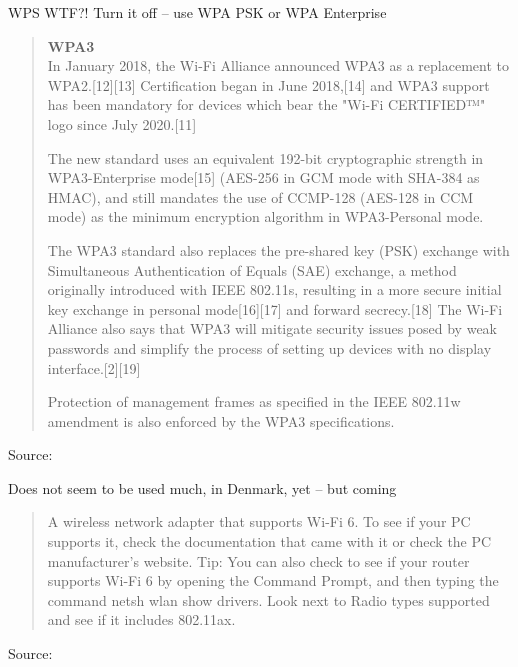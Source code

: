 \documentclass[Screen16to9,17pt]{foils}
\begin{document}
\vskip 1cm
\centerline{WPS WTF?! Turn it off -- use WPA PSK or WPA Enterprise}




\begin{quote}\small
{\bf WPA3}\\
In January 2018, the Wi-Fi Alliance announced WPA3 as a replacement to WPA2.[12][13] Certification began in June 2018,[14] and WPA3 support has been mandatory for devices which bear the "Wi-Fi CERTIFIED™" logo since July 2020.[11]

The new standard uses an equivalent 192-bit cryptographic strength in WPA3-Enterprise mode[15] (AES-256 in GCM mode with SHA-384 as HMAC), and still mandates the use of CCMP-128 (AES-128 in CCM mode) as the minimum encryption algorithm in WPA3-Personal mode.

The WPA3 standard also replaces the pre-shared key (PSK) exchange with Simultaneous Authentication of Equals (SAE) exchange, a method originally introduced with IEEE 802.11s, resulting in a more secure initial key exchange in personal mode[16][17] and forward secrecy.[18] The Wi-Fi Alliance also says that WPA3 will mitigate security issues posed by weak passwords and simplify the process of setting up devices with no display interface.[2][19]

Protection of management frames as specified in the IEEE 802.11w amendment is also enforced by the WPA3 specifications.
\end{quote}
Source: 

\begin{list2}
\item Does not seem to be used much, in Denmark, yet -- but coming
\end{list2}



\begin{quote}
A wireless network adapter that supports Wi-Fi 6. To see if your PC supports it, check the documentation that came with it or check the PC manufacturer’s website.
Tip: You can also check to see if your router supports Wi-Fi 6 by opening the Command Prompt, and then typing the command netsh wlan show drivers. Look next to Radio types supported and see if it includes 802.11ax.
\end{quote}
Source: 
\end{document}
